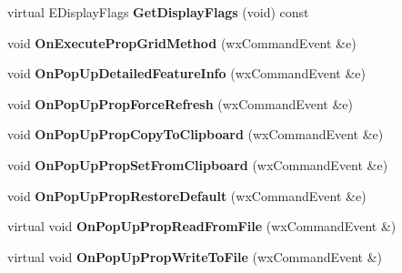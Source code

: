 \begin{DoxyCompactItemize}
\item 
\hypertarget{class_prop_grid_frame_base_a931715d5cd6200e96b1623ef5610444d}{virtual E\+Display\+Flags {\bfseries Get\+Display\+Flags} (void) const }\label{class_prop_grid_frame_base_a931715d5cd6200e96b1623ef5610444d}

\item 
\hypertarget{class_prop_grid_frame_base_ae3cd5ee5a62997b9867b007c13afb399}{void {\bfseries On\+Execute\+Prop\+Grid\+Method} (wx\+Command\+Event \&e)}\label{class_prop_grid_frame_base_ae3cd5ee5a62997b9867b007c13afb399}

\item 
\hypertarget{class_prop_grid_frame_base_a4add68ed57186fde59fec3fd38a691bc}{void {\bfseries On\+Pop\+Up\+Detailed\+Feature\+Info} (wx\+Command\+Event \&e)}\label{class_prop_grid_frame_base_a4add68ed57186fde59fec3fd38a691bc}

\item 
\hypertarget{class_prop_grid_frame_base_abd696bcead9ffb7d5464495841cbf208}{void {\bfseries On\+Pop\+Up\+Prop\+Force\+Refresh} (wx\+Command\+Event \&e)}\label{class_prop_grid_frame_base_abd696bcead9ffb7d5464495841cbf208}

\item 
\hypertarget{class_prop_grid_frame_base_a2192393f6639c1ae27b34e1cd1435669}{void {\bfseries On\+Pop\+Up\+Prop\+Copy\+To\+Clipboard} (wx\+Command\+Event \&e)}\label{class_prop_grid_frame_base_a2192393f6639c1ae27b34e1cd1435669}

\item 
\hypertarget{class_prop_grid_frame_base_ade214d0abe64eb87b758845d1d05b7ec}{void {\bfseries On\+Pop\+Up\+Prop\+Set\+From\+Clipboard} (wx\+Command\+Event \&e)}\label{class_prop_grid_frame_base_ade214d0abe64eb87b758845d1d05b7ec}

\item 
\hypertarget{class_prop_grid_frame_base_ad9b211e84bb0266476d236ce35269c16}{void {\bfseries On\+Pop\+Up\+Prop\+Restore\+Default} (wx\+Command\+Event \&e)}\label{class_prop_grid_frame_base_ad9b211e84bb0266476d236ce35269c16}

\item 
\hypertarget{class_prop_grid_frame_base_a8e94cc89e436667008f65adb111a81ce}{virtual void {\bfseries On\+Pop\+Up\+Prop\+Read\+From\+File} (wx\+Command\+Event \&)}\label{class_prop_grid_frame_base_a8e94cc89e436667008f65adb111a81ce}

\item 
\hypertarget{class_prop_grid_frame_base_a5f7df0b1ff31f8b61fcd88fb1734b533}{virtual void {\bfseries On\+Pop\+Up\+Prop\+Write\+To\+File} (wx\+Command\+Event \&)}\label{class_prop_grid_frame_base_a5f7df0b1ff31f8b61fcd88fb1734b533}


\end{DoxyCompactItemize}
